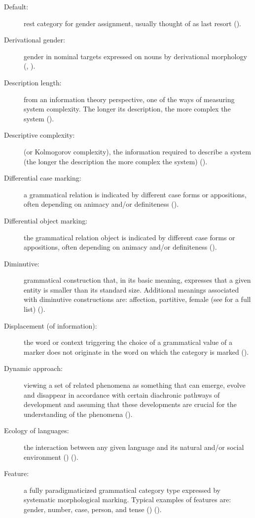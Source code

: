 \documentclass[output=collectionpaper]{langsci/langscibook}
\begin{document}
{\begin{description}
\item  [Default:] rest category for gender assignment, usually thought of as last resort ().
\item  [Derivational gender:] gender in nominal targets expressed on nouns by derivational morphology (, ).
\item  [Description length:] from an information theory perspective, one of the ways of measuring system complexity. The longer its description, the more complex the system ().
\item  [Descriptive complexity:] (or Kolmogorov complexity), the information required to describe a system (the longer the description the more complex the system) ().
\item  [Differential case marking:] a grammatical relation is indicated by different case forms or appositions, often depending on animacy and/or definiteness ().
\item  [Differential object marking:] the grammatical relation object is indicated by different case forms or appositions, often depending on animacy and/or definiteness ().
\item  [Diminutive:] grammatical construction that, in its basic meaning, expresses that a given entity is smaller than its standard size. Additional meanings associated with diminutive constructions are: affection, partitive, female (see \citealt{Jurafsky1996} for a full list) ().
\item  [Displacement (of information):] the word or context triggering the choice of a grammatical value of a marker does not originate in the word on which the category is marked ().
\item  [Dynamic approach:] viewing a set of related phenomena as something that can emerge, evolve and disappear in accordance with certain diachronic pathways of development and assuming that these developments are crucial for the understanding of the phenomena ().
\item  [Ecology of languages:] the interaction between any given language and its natural and/or social environment (\citealt{Haugen1972}) ().
\item  [Feature:] a fully paradigmaticized grammatical category type expressed by systematic morphological marking. Typical examples of features are: gender, number, case, person, and tense (\citealt{Corbett2012}) ().

\end{description}}
\end{document}
